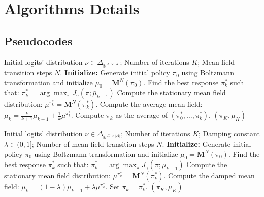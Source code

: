 \documentclass[10pt,twocolumn,letterpaper]{article}
\theoremstyle{definition}
\theoremstyle{remark}
\newcommand{\states}{\mathcal{X}}
\newcommand{\actions}{\mathcal{A}}
\begin{document}




\clearpage
\appendix
\onecolumn

\section{Algorithms Details}\label{app:algos}

\subsection{Pseudocodes}

\begin{algorithm}[H]
\small
\caption{Fictitious Play}
\label{algo:fp}
\begin{algorithmic}[1]
    \REQUIRE Initial logits' distribution $\nu\in\Delta_{\mathbb{R}^{|\mathcal{S}|\times|\actions|}}$; Number of iterations $K$; Mean field transition steps $N$.
    \STATE \textbf{Initialize:} Generate initial policy $\bar\pi_0$ using Boltzmann transformation and initialize $\bar\mu_0=\mathbf{M}^N(\bar\pi_0)$.
        \STATE Find the best response $\pi_k^*$ such that: $\pi_k^* = \arg\max_{\pi} J_{\gamma} (\pi;\bar\mu_{k-1})$
        \STATE Compute the stationary mean field distribution: $\mu^{\pi^*_k} = \mathbf{M}^N(\pi^*_k)$.
        \STATE Compute the average mean field: $\bar\mu_k = \frac{k}{k+1}\bar\mu_{k-1} + \frac{1}{k}\mu^{\pi^*_k}$.
        \STATE Compute $\bar\pi_k$ as the average of $(\pi^*_0, \dots,\pi^*_k)$.
\ENDFOR
\ENSURE $(\bar\pi_K,\bar\mu_K)$
\end{algorithmic}
\end{algorithm}


\begin{algorithm}[H]
\small
\caption{Damped Fictitious Play}
\label{algo:dampedfp}
\begin{algorithmic}[1]
    \REQUIRE Initial logits' distribution $\nu\in\Delta_{\mathbb{R}^{|\states|\times|\actions|}}$; Number of iterations $K$; Damping constant $\lambda \in (0,1]$; Number of mean field transition steps $N$.
    \STATE \textbf{Initialize:} Generate initial policy $\pi_0$ using Boltzmann transformation and initialize $\mu_0=\mathbf{M}^N(\pi_0)$.
        \STATE Find the best response $\pi_k^*$ such that: $\pi_k^* = \arg\max_{\pi} J_{\gamma} (\pi;\mu_{k-1})$
        \STATE Compute the stationary mean field distribution: $\mu^{\pi^*_k} = \mathbf{M}^N(\pi^*_k)$.
        \STATE Compute the damped mean field: $\mu_k = (1-\lambda)\mu_{k-1} + \lambda\mu^{\pi^*_k}$.
        \STATE Set $\pi_k = \pi_k^*$.
    \ENDFOR
    \ENSURE $(\pi_K,\mu_K)$
\end{algorithmic}
\end{algorithm}
\end{document}
